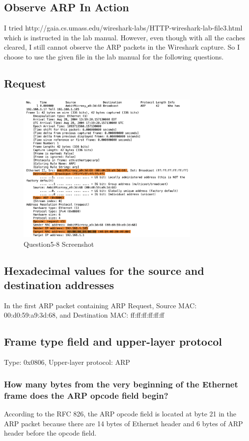 \documentclass{article}
\begin{document}
\begin{CJK*}{UTF8}{gbsn}
\section{Observe ARP In Action}
I tried http://gaia.cs.umass.edu/wireshark-labs/HTTP-wireshark-lab-file3.html
which is instructed in the lab manual. However, even though with all the caches cleared, I still
cannot observe the ARP packets in the Wireshark capture.
So I choose to use the given file in the lab manual for the following questions.

\subsection{Request}
\begin{figure}[H]
    \centering
    \includegraphics[width=0.8\textwidth]{12.png}
    \caption{Question5-8 Screenshot}
\end{figure}
\subsection{Hexadecimal values for the source and destination addresses}
In the first ARP packet containing ARP Request,
Source MAC: 00:d0:59:a9:3d:68, and Destination MAC: ff:ff:ff:ff:ff:ff
\subsection{Frame type field and upper-layer protocol}
Type: 0x0806, 
Upper-layer protocol: ARP


\subsubsection{How many bytes from the very beginning of the Ethernet frame does the ARP opcode field begin?}
According to the RFC 826,
the ARP opcode field is located at byte 21 in the ARP packet because
there are 14 bytes of Ethernet header and 6 bytes of ARP header before the opcode field.

\end{CJK*}
\end{document}
